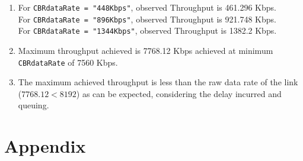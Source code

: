 \documentclass[12pt, fleqn]{article}
\begin{document}
\begin{enumerate}
    \item For \texttt{CBRdataRate = "448Kbps"}, observed Throughput is 461.296 Kbps. \\
    For \texttt{CBRdataRate = "896Kbps"}, observed Throughput is 921.748 Kbps.\\
    For \texttt{CBRdataRate = "1344Kbps"}, observed Throughput is 1382.2 Kbps.
    \item Maximum throughput achieved is 7768.12 Kbps achieved at minimum \texttt{CBRdataRate} of 7560 Kbps.
    \item The maximum achieved throughput is less than the raw data rate of the link ($7768.12 < 8192$) as can be expected, considering the delay incurred and queuing.
\end{enumerate}

\newpage
\section*{Appendix}
\setcounter{equation}{0}
\end{document}
